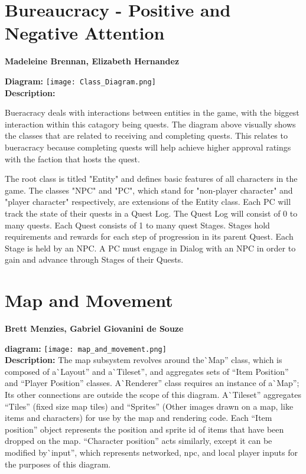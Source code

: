 \documentclass[12pt]{report}
\begin{document}
\chapter{Bureaucracy - Positive and Negative Attention}
\textbf{Madeleine Brennan, Elizabeth Hernandez}

\textbf{Diagram:}
\texttt{[image: Class\_Diagram.png]}\\

\textbf{Description:}

Bueracracy deals with interactions between entities in the game, with the biggest interaction within this catagory being quests. The diagram above visually shows the classes that are related to receiving and completing quests. This relates to bueracracy because completing quests will help achieve higher approval ratings with the faction that hosts the quest.

The root class is titled "Entity" and defines basic features of all characters in the game.
The classes "NPC" and "PC", which stand for "non-player character" and "player character" respectively, are extensions of the Entity class. 
Each PC will track the state of their quests in a Quest Log. 
The Quest Log will consist of 0 to many quests.
Each Quest consists of 1 to many quest Stages.
Stages hold requirements and rewards for each step of progression in its parent Quest.
Each Stage is held by an NPC.
A PC must engage in Dialog with an NPC in order to gain and advance through Stages of their Quests.

\chapter{Map and Movement}
\textbf{Brett Menzies, Gabriel Giovanini de Souze}

\textbf{diagram:}
\texttt{[image: map\_and\_movement.png]}\\
\textbf{Description:}
The map subsystem revolves around the\`{ }Map'' class,
which is composed of a\`{ }Layout'' and a\`{ }Tileset'',
 and aggregates sets of ``Item Position'' and ``Player Position'' classes.
 A\`{ }Renderer'' class requires an instance of a\`{ }Map'';
  Its other connections are outside the scope of this diagram.
  A\`{ }Tileset'' aggregates ``Tiles'' (fixed size map tiles) and 
   ``Sprites'' (Other images drawn on a map, like items and characters) for use by the map and rendering code.
    Each ``Item position'' object represents the position and sprite id of items that have been dropped on the map.
    ``Character position'' acts similarly, except it can be modified by\`{ }input'', which represents 
     networked, npc, and local player inputs for the purposes of this diagram.
\end{document}
